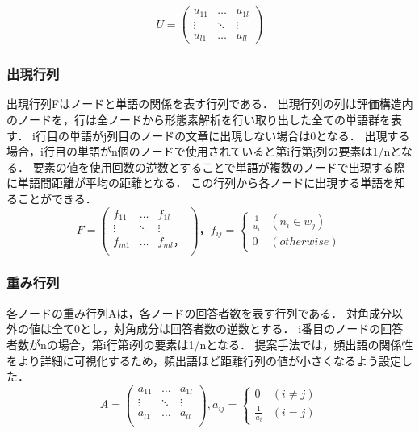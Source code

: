 \documentclass[syuuron]{kuee}
\begin{document}
				\begin{eqnarray}
				 U = \left(
				    \begin{array}{cccc}
				    	u_{11} & \ldots & u_{1l} \\
				    	\vdots & \ddots & \vdots \\
				    	u_{l1} & \ldots & u_{ll}
					\end{array}
				 \right)
				\end{eqnarray}	
		
			\subsubsection{出現行列}
				出現行列Fはノードと単語の関係を表す行列である．
				出現行列の列は評価構造内のノードを，行は全ノードから形態素解析を行い取り出した全ての単語群を表す．
				i行目の単語がj列目のノードの文章に出現しない場合は0となる．
				出現する場合，i行目の単語がn個のノードで使用されていると第i行第j列の要素は1/nとなる．
				要素の値を使用回数の逆数とすることで単語が複数のノードで出現する際に単語間距離が平均の距離となる．
				この行列から各ノードに出現する単語を知ることができる．
				\begin{equation}
				 	F = \left(
				    \begin{array}{cccc}
				    	f_{11} & \ldots & f_{1l} \\
				    	\vdots & \ddots & \vdots \\
				    	f_{m1} & \ldots & f_{ml}，\\ 
					\end{array}
					\right)，
				 	f_{ij} = \left\{ \begin{array}{ll}
						\frac{1}{u_i} & (n_i \in w_j) \\
				    	0 & (otherwise)
				  	\end{array} 
				  	\right.
				\end{equation}
				
			\subsubsection{重み行列}
				各ノードの重み行列Aは，各ノードの回答者数を表す行列である．
				対角成分以外の値は全て0とし，対角成分は回答者数の逆数とする．
				i番目のノードの回答者数がnの場合，第i行第i列の要素は1/nとなる．
				提案手法では，頻出語の関係性をより詳細に可視化するため，頻出語ほど距離行列の値が小さくなるよう設定した．
				\begin{equation}
				 A = \left(
				    \begin{array}{cccc}
				    	a_{11} & \ldots & a_{1l} \\
				    	\vdots & \ddots & \vdots \\
				    	a_{l1} & \ldots & a_{ll} \\
					\end{array}
				 \right),
				 a_{ij} = \left\{ \begin{array}{ll}
				     0 & (i ≠ j) \\
				     \frac{1}{a_i} & (i = j)
				  \end{array} \right.
				\end{equation}
				
\end{document}
